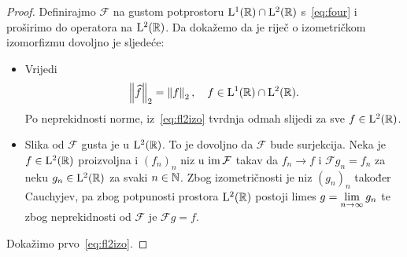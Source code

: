 \documentclass[main.tex]{subfiles}
\begin{document}
\begin{proof}
	Definirajmo \( \mathcal F \) na gustom potprostoru \( \mathrm{L}^1(\mathbb{R}) \cap \mathrm{L}^2(\mathbb{R}) \) s~\eqref{eq:four}
	i proširimo do operatora na \( \mathrm{L}^2(\mathbb{R}) \). Da dokažemo da je riječ o izometričkom izomorfizmu
	dovoljno je sljedeće:
	\begin{itemize}
		\item Vrijedi
		      \begin{equation}\label{eq:fl2izo}
			      \left\lVert\widehat{f}\right\rVert_2 = \left\lVert f\right\rVert_2, \quad f\in \mathrm{L}^1(\mathbb{R}) \cap \mathrm{L}^2(\mathbb{R}).
		      \end{equation}
		      Po neprekidnosti norme, iz~\eqref{eq:fl2izo} tvrdnja
		      odmah slijedi za sve \( f \in \mathrm{L}^2(\mathbb{R}) \).

		\item Slika od \( \mathcal F \) gusta je u \( \mathrm{L}^2(\mathbb{R}) \).
		      To je dovoljno da \( \mathcal F \) bude surjekcija. Neka je
		      \( f \in \mathrm{L}^2(\mathbb{R}) \) proizvoljna i \( (f_n)_n \) niz u \( \operatorname{im} \mathcal F \)
		      takav da \( f_n \rightarrow f \) i \( \mathcal F g_n = f_n \)
		      za neku \( g_n \in \mathrm{L}^2(\mathbb{R}) \) za svaki \( n \in \mathbb{N} \).
		      Zbog izometričnosti je niz \( (g_n)_n \) također Cauchyjev,
		      pa zbog potpunosti prostora \( \mathrm{L}^2(\mathbb{R}) \) postoji limes
		      \( g = \lim\limits_{n \rightarrow \infty} g_n \) te zbog neprekidnosti
		      od \( \mathcal F \) je \( \mathcal Fg = f \).
	\end{itemize}

	Dokažimo prvo~\eqref{eq:fl2izo}.
\end{proof}
\end{document}
